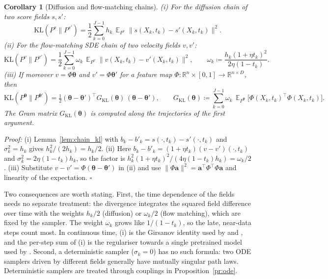 \documentclass{article}
\DeclareMathOperator{\E}{\mathbb{E}}
\newcommand{\RR}{\mathbb{R}}
\newcommand{\Pv}[1]{P^{#1}}                         %
\newcommand{\KL}{\mathrm{KL}}
\newcommand{\GKL}{G_{\mathrm{KL}}}
\newcommand{\bth}{\boldsymbol{\theta}}
\theoremstyle{plain}
\newtheorem{corollary}{Corollary}
\begin{document}
\begin{corollary}[Diffusion and flow-matching chains]\label{cor:fm_kl}
(i) For the diffusion chain of two score fields $s,s'$:
\[
  \KL(\Pv{s}\|\Pv{s'})=\frac12\sum_{k=0}^{J-1}h_k\,\E_{\Pv{s}}\big\|s(X_k,t_k)-s'(X_k,t_k)\big\|^2 .
\]
(ii) For the flow-matching SDE chain of two velocity fields $v,v'$:
\[
  \KL(\Pv{v}\|\Pv{v'})=\frac12\sum_{k=0}^{J-1}\omega_k\,\E_{\Pv{v}}\big\|v(X_k,t_k)-v'(X_k,t_k)\big\|^2,
  \qquad \omega_k\coloneqq\frac{h_k(1+\eta t_k)^2}{2\eta(1-t_k)} .
\]
(iii) If moreover $v=\Phi\bth$ and $v'=\Phi\bth'$ for a feature map
$\Phi:\RR^n\times[0,1]\to\RR^{n\times D}$, then
\[
  \KL(\Pv{\bth}\|\Pv{\bth'})=\tfrac12(\bth-\bth')^\top\GKL(\bth)\,(\bth-\bth'),
  \qquad
  \GKL(\bth)\coloneqq\sum_{k=0}^{J-1}\omega_k\,\E_{\Pv{\bth}}\big[\Phi(X_k,t_k)^\top\Phi(X_k,t_k)\big].
\]
The Gram matrix $\GKL(\bth)$ is computed along the trajectories of the \emph{first} argument.
\end{corollary}
\textit{Proof:}
(i) Lemma~\ref{lem:chain_kl} with $b_k-b'_k=s(\cdot,t_k)-s'(\cdot,t_k)$ and $\sigma_k^2=h_k$ gives
$h_k^2/(2h_k)=h_k/2$. (ii) Here $b_k-b'_k=(1+\eta t_k)(v-v')(\cdot,t_k)$ and
$\sigma_k^2=2\eta(1-t_k)h_k$, so the factor is
$h_k^2(1+\eta t_k)^2/(4\eta(1-t_k)h_k)=\omega_k/2$. (iii) Substitute $v-v'=\Phi(\bth-\bth')$ in (ii)
and use $\|\Phi\mathbf{a}\|^2=\mathbf{a}^\top\Phi^\top\Phi\mathbf{a}$ and linearity of the
expectation. \hfill $\square$

Two consequences are worth stating. First, the time dependence of the fields needs no
separate treatment: the divergence integrates the squared field difference over time with
the weights $h_k/2$ (diffusion) or $\omega_k/2$ (flow matching), which are fixed by the sampler.
The weight $\omega_k$ grows like $1/(1-t_k)$, so the late, near-data steps count most.
In continuous time, (i) is the Girsanov identity used by \citet{song2021maximum} and
\citet{chen2023sampling}, and the per-step sum of (i) is the regulariser towards a single
pretrained model used by \citet[Lemma~4.2]{fan2023dpok}. Second, a deterministic sampler
($\sigma_k=0$) has no such formula: two ODE samplers driven by different fields generally have
mutually singular path laws. Deterministic samplers are treated through couplings in
Proposition~\ref{pr:ode}.
\end{document}
